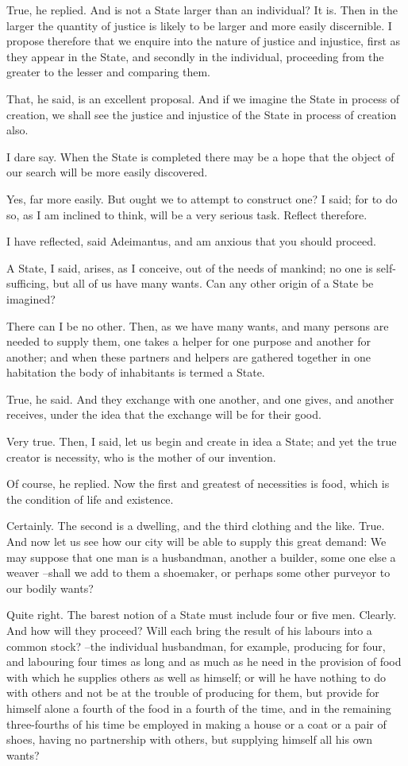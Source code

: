True, he replied.
And is not a State larger than an individual?
It is.
Then in the larger the quantity of justice is likely to be larger and more easily discernible. I propose therefore that we enquire into the nature of justice and injustice, first as they appear in the State, and secondly in the individual, proceeding from the greater to the lesser and comparing them.

That, he said, is an excellent proposal.
And if we imagine the State in process of creation, we shall see the justice and injustice of the State in process of creation also.

I dare say.
When the State is completed there may be a hope that the object of our search will be more easily discovered.

Yes, far more easily.
But ought we to attempt to construct one? I said; for to do so, as I am inclined to think, will be a very serious task. Reflect therefore.

I have reflected, said Adeimantus, and am anxious that you should proceed.

A State, I said, arises, as I conceive, out of the needs of mankind; no one is self-sufficing, but all of us have many wants. Can any other origin of a State be imagined?

There can I be no other.
Then, as we have many wants, and many persons are needed to supply them, one takes a helper for one purpose and another for another; and when these partners and helpers are gathered together in one habitation the body of inhabitants is termed a State.

True, he said.
And they exchange with one another, and one gives, and another receives, under the idea that the exchange will be for their good.

Very true.
Then, I said, let us begin and create in idea a State; and yet the true creator is necessity, who is the mother of our invention.

Of course, he replied.
Now the first and greatest of necessities is food, which is the condition of life and existence.

Certainly.
The second is a dwelling, and the third clothing and the like.
True.
And now let us see how our city will be able to supply this great demand: We may suppose that one man is a husbandman, another a builder, some one else a weaver --shall we add to them a shoemaker, or perhaps some other purveyor to our bodily wants?

Quite right.
The barest notion of a State must include four or five men.
Clearly.
And how will they proceed? Will each bring the result of his labours into a common stock? --the individual husbandman, for example, producing for four, and labouring four times as long and as much as he need in the provision of food with which he supplies others as well as himself; or will he have nothing to do with others and not be at the trouble of producing for them, but provide for himself alone a fourth of the food in a fourth of the time, and in the remaining three-fourths of his time be employed in making a house or a coat or a pair of shoes, having no partnership with others, but supplying himself all his own wants?

